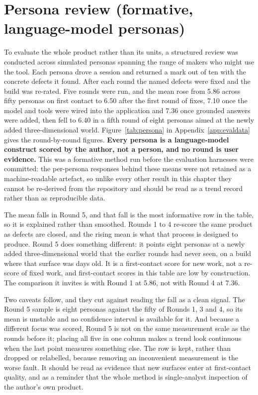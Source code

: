 \documentclass[11pt,a4paper]{report}
\begin{document}
\section{Persona review (formative, language-model personas)}
To evaluate the whole product rather than its units, a structured review was conducted across simulated personas spanning the range of makers who might use the tool. Each persona drove a session and returned a mark out of ten with the concrete defects it found. After each round the named defects were fixed and the build was re-rated. Five rounds were run, and the mean rose from 5.86 across fifty personas on first contact to 6.50 after the first round of fixes, 7.10 once the model and tools were wired into the application and 7.36 once grounded answers were added, then fell to 6.40 in a fifth round of eight personas aimed at the newly added three-dimensional world. Figure~\ref{tab:persona} in Appendix~\ref{app:evaldata} gives the round-by-round figures. \textbf{Every persona is a language-model construct scored by the author, not a person, and no round is user evidence.} This was a formative method run before the evaluation harnesses were committed: the per-persona responses behind these means were not retained as a machine-readable artefact, so unlike every other result in this chapter they cannot be re-derived from the repository and should be read as a trend record rather than as reproducible data.

The mean falls in Round 5, and that fall is the most informative row in the table, so it is explained rather than smoothed. Rounds 1 to 4 re-score the same product as defects are closed, and the rising mean is what that process is designed to produce. Round 5 does something different: it points eight personas at a newly added three-dimensional world that the earlier rounds had never seen, on a build where that surface was days old. It is a first-contact score for new work, not a re-score of fixed work, and first-contact scores in this table are low by construction. The comparison it invites is with Round 1 at 5.86, not with Round 4 at 7.36.

Two caveats follow, and they cut against reading the fall as a clean signal. The Round 5 sample is eight personas against the fifty of Rounds 1, 3 and 4, so its mean is unstable and no confidence interval is available for it. And because a different focus was scored, Round 5 is not on the same measurement scale as the rounds before it; placing all five in one column makes a trend look continuous when the last point measures something else. The row is kept, rather than dropped or relabelled, because removing an inconvenient measurement is the worse fault. It should be read as evidence that new surfaces enter at first-contact quality, and as a reminder that the whole method is single-analyst inspection of the author's own product.
\end{document}
